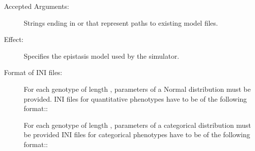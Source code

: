 \documentclass[a4paper,10pt,english]{sphinxhowto}
\begin{document}
\begin{description}
\begin{description}
\begin{description}
\item[{Accepted Arguments:}] \leavevmode
Strings ending in  or  that represent paths to existing model files.

\item[{Effect:}] \leavevmode
Specifies the epistasis model used by the simulator.

\item[{Format of INI files:}] \leavevmode
For each genotype of length , parameters of a Normal distribution must be provided.
INI files for quantitative phenotypes have to be of the following format::

\begin{sphinxVerbatim}[commandchars=\\\{\}]
\PYG{p}{[} \PYG{p}{]}
  
  
\PYG{p}{[} \PYG{p}{]}
  
  
\end{sphinxVerbatim}

For each genotype of length , parameters of a categorical distribution must be provided
INI files for categorical phenotypes have to be of the following format::

\begin{sphinxVerbatim}[commandchars=\\\{\}]
\PYG{p}{[} \PYG{p}{]}
  
  
\PYG{p}{[} \PYG{p}{]}
  
  
\end{sphinxVerbatim}


\end{description}
\end{description}
\end{description}
\end{document}
